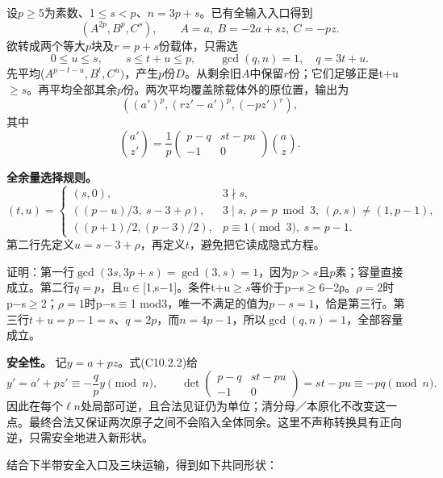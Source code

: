 \documentclass[11pt,a4paper]{article}
\theoremstyle{definition}
\numberwithin{equation}{section}
\begin{document}
{设\ensuremath{p}\ensuremath{\ge}5为素数、1\ensuremath{\le}\ensuremath{s<p}、\ensuremath{n=3p+s}。已有全输入入口得到} \[
(A^{2p},B^p,C^s),\qquad A=a,\ B=-2a+sz,\ C=-pz.
\] {欲转成两个等大\ensuremath{p}块及\ensuremath{r=p+s}份载体，只需选} \[
0\le u\le s,\qquad s\le t+u\le p,\qquad
\gcd(q,n)=1,\quad q=3t+u.
\tag{C10.2.1}
\] {先平均(\ensuremath{A^{p-t-u},B^{t},C^{u})}，产生\ensuremath{p}份\ensuremath{D}。从剩余旧\ensuremath{A}中保留\ensuremath{r}份；它们足够正是t+u\ensuremath{\ge}\ensuremath{s}。再平均全部其余\ensuremath{p}份。两次平均覆盖除载体外的原位置，输出为} \[
((a')^p,(rz'-a')^p,(-pz')^r),
\] {其中} \[
\binom{a'}{z'}=\frac1p
\begin{pmatrix}p-q&st-pu\\-1&0\end{pmatrix}\binom az.
\tag{C10.2.2}
\]

\textbf{{全余量选择规则。}} \[
(t,u)=
\begin{cases}
(s,0),&3\nmid s,\\
((p-u)/3,\ s-3+\rho),&3\mid s,\ \rho=p\bmod3,\ (\rho,s)\ne(1,p-1),\\
((p+1)/2,(p-3)/2),&p\equiv1\pmod3,\ s=p-1.
\end{cases}
\tag{C10.2.3}
\] {第二行先定义\ensuremath{u=s-3+\rho }，再定义\ensuremath{t}，避免把它读成隐式方程。}

{证明：第一行\ensuremath{\operatorname{gcd}(3s,3p+s)=\operatorname{gcd}(3,s)=1}，因为\ensuremath{p>s}且\ensuremath{p}素；容量直接成立。第二行\ensuremath{q=p}，且\ensuremath{u}\ensuremath{\in}{[}1,s−1{]}。条件t+u\ensuremath{\ge}\ensuremath{s}等价于p−s\ensuremath{\ge}6−2ρ。\ensuremath{\rho =2}时p−s\ensuremath{\ge}2；\ensuremath{\rho =1}时p−s\ensuremath{\equiv}1} {mod3，唯一不满足的值为\ensuremath{p-s=1}，恰是第三行。第三行\ensuremath{t+u=p-1=s}、\ensuremath{q=2p}，而\ensuremath{n=4p-1}，所以\ensuremath{\operatorname{gcd}(q,n)=1}，全部容量成立。}

\textbf{{安全性。}} {记\ensuremath{y=a+pz}。式(C10.2.2)给} \[
y'=a'+pz'\equiv-\frac qp y\pmod n,
\qquad
\det\begin{pmatrix}p-q&st-pu\\-1&0\end{pmatrix}
=st-pu\equiv-pq\pmod n.
\tag{C10.2.4}
\] {因此在每个\ensuremath{\ell}\textbar{}\ensuremath{n}处局部可逆，且合法见证仍为单位；清分母／本原化不改变这一点。最终合法又保证两次原子之间不会陷入全体同余。这里不声称转换具有正向逆，只需安全地进入新形状。}

{结合下半带安全入口及三块运输，得到如下共同形状：}
\end{document}
